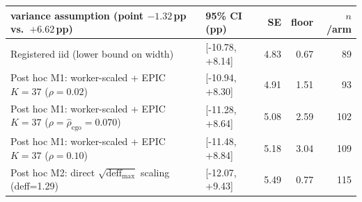 \begin{tabular}{@{}llrrr@{}}
\toprule
variance assumption (point $-1.32$\,pp vs.\ $+6.62$\,pp) & 95\% CI (pp) & SE & floor & $n$/arm \\
\midrule
Registered iid (lower bound on width) & [-10.78, +8.14] & 4.83 & 0.67 & 89 \\
Post hoc M1: worker-scaled + EPIC $K{=}37$ ($\rho{=}0.02$) & [-10.94, +8.30] & 4.91 & 1.51 & 93 \\
Post hoc M1: worker-scaled + EPIC $K{=}37$ ($\rho{=}\hat{\rho}_{\text{ego}}{=}0.070$) & [-11.28, +8.64] & 5.08 & 2.59 & 102 \\
Post hoc M1: worker-scaled + EPIC $K{=}37$ ($\rho{=}0.10$) & [-11.48, +8.84] & 5.18 & 3.04 & 109 \\
Post hoc M2: direct $\sqrt{\text{deff}_{\max}}$ scaling (deff=1.29) & [-12.07, +9.43] & 5.49 & 0.77 & 115 \\
\bottomrule
\end{tabular}

